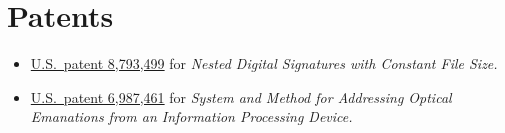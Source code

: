 \section*{Patents}

\vspace{-2mm}
\begin{itemize}
    \item \href{http://google.com/patents/US8793499}{U.S.\ patent
        8,793,499} for \emph{Nested Digital Signatures with Constant
        File Size.}

    \item \href{http://www.google.com/patents/US6987461}{U.S.\ patent
        6,987,461} for \emph{System and Method for Addressing Optical
        Emanations from an Information Processing Device.}
\end{itemize}

